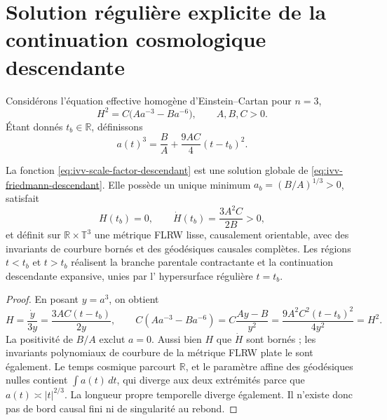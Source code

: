 
\section{Solution régulière explicite de la continuation cosmologique descendante}
\label{sec:ivv-descendant-explicit}

Considérons l'équation effective homogène d'Einstein--Cartan pour
\(n=3\),
\begin{equation}
 H^2=C\bigl(Aa^{-3}-Ba^{-6}\bigr),
 \qquad A,B,C>0.
 \label{eq:ivv-friedmann-descendant}
\end{equation}
Étant donnés \(t_b\in\mathbb R\), définissons
\begin{equation}
 a(t)^3=\frac BA+\frac{9AC}{4}(t-t_b)^2.
 \label{eq:ivv-scale-factor-descendant}
\end{equation}

\begin{theorem}
\label{thm:ivv-descendant-existence}
La fonction \eqref{eq:ivv-scale-factor-descendant} est une solution globale de
\eqref{eq:ivv-friedmann-descendant}. Elle possède un unique minimum
\(a_b=(B/A)^{1/3}>0\), satisfait
\[
 H(t_b)=0,
 \qquad
 \dot H(t_b)=\frac{3A^2C}{2B}>0,
\]
et définit sur \(\mathbb R\times\mathbb T^3\) une métrique FLRW lisse,
causalement orientable, avec des invariants de courbure bornés et des géodésiques
causales complètes. Les régions \(t<t_b\) et \(t>t_b\) réalisent la branche
parentale contractante et la continuation descendante expansive, unies par l'
hypersurface régulière \(t=t_b\).
\end{theorem}

\begin{proof}
En posant \(y=a^3\), on obtient
\[
 H=\frac{\dot y}{3y}=\frac{3AC(t-t_b)}{2y},
 \qquad
 C(Aa^{-3}-Ba^{-6})
 =C\frac{Ay-B}{y^2}
 =\frac{9A^2C^2(t-t_b)^2}{4y^2}=H^2.
\]
La positivité de \(B/A\) exclut \(a=0\). Aussi bien \(H\) que \(\dot H\)
sont bornés ; les invariants polynomiaux de courbure de la métrique FLRW
plate le sont également. Le temps cosmique parcourt \(\mathbb R\), et le paramètre
affine des géodésiques nulles contient \(\int a(t)\,dt\), qui diverge aux deux
extrémités parce que \(a(t)\asymp |t|^{2/3}\). La longueur propre temporelle diverge
également. Il n'existe donc pas de bord causal fini ni de singularité au
rebond.
\end{proof}

